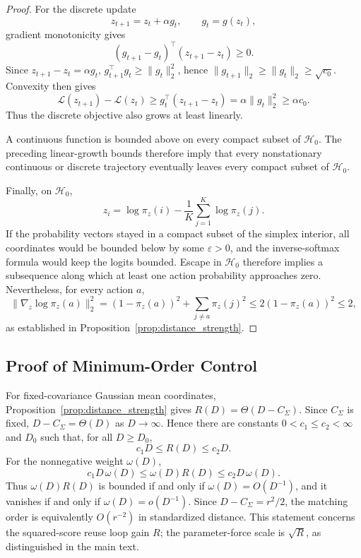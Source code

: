 \documentclass{article}
\theoremstyle{plain}
\theoremstyle{definition}
\theoremstyle{remark}
\begin{document}
\begin{proof}
For the discrete update
\[
z_{t+1}=z_t+\alpha g_t,
\qquad
g_t=g(z_t),
\]
gradient monotonicity gives
\[
(g_{t+1}-g_t)^\top(z_{t+1}-z_t)\ge0.
\]
Since \(z_{t+1}-z_t=\alpha g_t\),
\(g_{t+1}^\top g_t\ge\|g_t\|_2^2\), hence
\(\|g_{t+1}\|_2\ge\|g_t\|_2\ge\sqrt{c_0}\). Convexity then gives
\[
\mathcal L(z_{t+1})-\mathcal L(z_t)
\ge
g_t^\top(z_{t+1}-z_t)
=
\alpha\|g_t\|_2^2
\ge
\alpha c_0.
\]
Thus the discrete objective also grows at least linearly.

A continuous function is bounded above on every compact subset of
\(\mathcal H_0\). The preceding linear-growth bounds therefore imply
that every nonstationary continuous or discrete trajectory eventually
leaves every compact subset of \(\mathcal H_0\).

Finally, on \(\mathcal H_0\),
\[
z_i
=
\log\pi_z(i)
-
\frac1K\sum_{j=1}^K\log\pi_z(j).
\]
If the probability vectors stayed in a compact subset of the simplex
interior, all coordinates would be bounded below by some
\(\varepsilon>0\), and the inverse-softmax formula would keep the logits
bounded. Escape in \(\mathcal H_0\) therefore implies a subsequence along
which at least one action probability approaches zero. Nevertheless,
for every action \(a\),
\[
\|\nabla_z\log\pi_z(a)\|_2^2
=
(1-\pi_z(a))^2+\sum_{j\ne a}\pi_z(j)^2
\le
2(1-\pi_z(a))^2
\le2,
\]
as established in Proposition~\ref{prop:distance_strength}.
\end{proof}

\subsection{Proof of Minimum-Order Control}
\label{app:min_order_control}

For fixed-covariance Gaussian mean coordinates,
Proposition~\ref{prop:distance_strength} gives
\(R(D)=\Theta(D-C_\Sigma)\). Since \(C_\Sigma\) is fixed,
\(D-C_\Sigma=\Theta(D)\) as \(D\to\infty\). Hence there are
constants \(0<c_1\le c_2<\infty\) and \(D_0\) such that, for all
\(D\ge D_0\),
\[
c_1D
\le
R(D)
\le
c_2D.
\]
For the nonnegative weight \(\omega(D)\),
\[
c_1D\,\omega(D)
\le
\omega(D)R(D)
\le
c_2D\,\omega(D).
\]
Thus \(\omega(D)R(D)\) is bounded if and only if
\(\omega(D)=O(D^{-1})\), and it vanishes if and only if
\(\omega(D)=o(D^{-1})\). Since
\(D-C_\Sigma=r^2/2\), the matching order is equivalently
\(O(r^{-2})\) in standardized distance. This statement concerns the
squared-score reuse loop gain \(R\); the parameter-force scale is
\(\sqrt R\), as distinguished in the main text.
\end{document}
